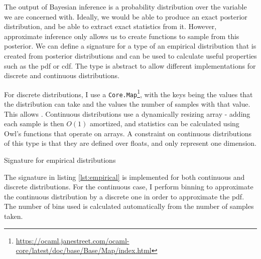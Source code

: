 The output of Bayesian inference is a probability distribution over the variable we are concerned with. Ideally, we would be able to produce an exact posterior distribution, and be able to extract exact statistics from it. However, approximate inference only allows us to create functions to sample from this posterior. We can define a signature for a type of an empirical distribution that is created from posterior distributions and can be used to calculate useful properties such as the pdf or cdf. The type is abstract to allow different implementations for discrete and continuous distributions. 
	
For discrete distributions, I use a \texttt{Core.Map}\footnote{\url{https://ocaml.janestreet.com/ocaml-core/latest/doc/base/Base/Map/index.html}}, with the keys being the values that the distribution can take and the values the number of samples with that value. This allows . Continuous distributions use a dynamically resizing array - adding each sample is then $O(1)$ amortized, and statistics can be calculated using Owl's functions that operate on arrays. A constraint on continuous distributions of this type is that they are defined over floats, and only represent one dimension.
	
	
\begin{listing}[ht]
	\caption{Signature for empirical distributions}
	\label{lst:empirical}
\end{listing}
	
The signature in listing \ref{lst:empirical} is implemented for both continuous and discrete distributions. For the continuous case, I perform binning to approximate the continuous distribution by a discrete one in order to approximate the pdf. The number of bins used is calculated automatically from the number of samples taken.
	
